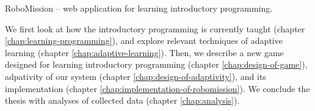 %
  {RoboMission -- web application for learning introductory programming.}

We first look at how the introductory programming is currently taught
(chapter \ref{chap:learning-programming}),
and explore relevant techniques of adaptive learning (chapter \ref{chap:adaptive-learning}).
Then, we describe a new game designed for learning introductory programming
(chapter \ref{chap:design-of-game}),
adpativity of our system (chapter \ref{chap:design-of-adaptivity}),
and its implementation (chapter \ref{chap:implementation-of-robomission}).
We conclude the thesis with analyses of collected data
(chapter \ref{chap:analysis}).
